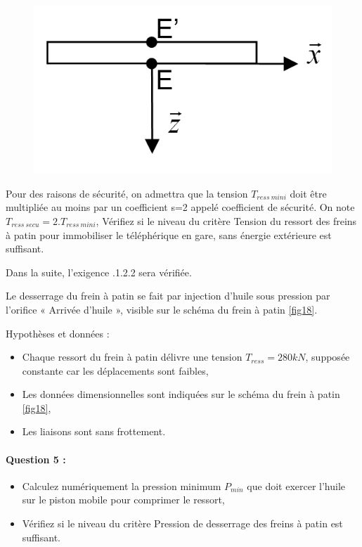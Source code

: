 \begin{figure}
	\vspace{-20pt}
	\centering \includegraphics[width=0.8\linewidth]{img/fig22}
	\label{fig22}
\end{figure}
 
Pour des raisons de sécurité, on admettra que la tension $T_{ress\ mini}$ doit être multipliée au moins par un coefficient s=2 appelé coefficient de sécurité. On note $T_{ress\ secu}=2.T_{ress\ mini}$,
Vérifiez si le niveau du critère \og Tension du ressort des freins à patin pour immobiliser le téléphérique en gare, sans énergie extérieure \fg est suffisant.

Dans la suite, l'exigence .1.2.2 \fg sera vérifiée.

Le desserrage du frein à patin se fait par injection d'huile sous pression par l'orifice « Arrivée d'huile », visible sur le schéma du frein à patin \ref{fig18}.

Hypothèses et données :
\begin{itemize}
 \item Chaque ressort du frein à patin délivre une tension $T_{ress}=280kN$, supposée constante car les déplacements sont faibles,
 \item Les données dimensionnelles sont indiquées sur le schéma du frein à patin \ref{fig18},
 \item Les liaisons sont sans frottement.
\end{itemize}

\paragraph{Question 5 :}

\begin{itemize}
 \item Calculez numériquement la pression minimum $P_{min}$ que doit exercer l'huile sur le piston mobile pour comprimer le ressort,
 \item Vérifiez si le niveau du critère \og Pression de desserrage des freins à patin \fg est suffisant.
\end{itemize}

